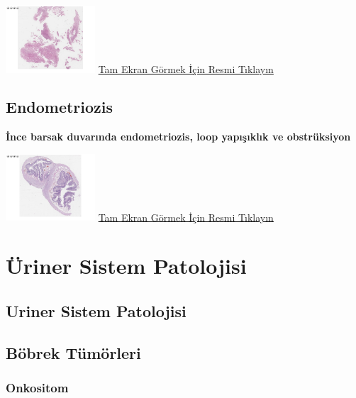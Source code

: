 \documentclass[
  letterpaper,
  DIV=11,
  numbers=noendperiod]{scrreprt}
\begin{document}
\href{https://images.patolojiatlasi.com/endometrial-polyp/HE.html}{\includegraphics[width=0.25\textwidth,height=\textheight]{./screenshots/thumbnail_endometrial-polyp.png}}
\href{https://images.patolojiatlasi.com/endometrial-polyp/HE.html}{Tam
Ekran Görmek İçin Resmi Tıklayın}

\hypertarget{sec-endometriozis}{%
\chapter{Endometriozis}\label{sec-endometriozis}}

\textbf{İnce barsak duvarında endometriozis, loop yapışıklık ve
obstrüksiyon}

\href{https://images.patolojiatlasi.com/endometriosis/HE.html}{\includegraphics[width=0.25\textwidth,height=\textheight]{./screenshots/thumbnail_endometriosis.png}}
\href{https://images.patolojiatlasi.com/endometriosis/HE.html}{Tam Ekran
Görmek İçin Resmi Tıklayın}

\part{Üriner Sistem Patolojisi}

\hypertarget{sec-uriner-sistem-patolojisi}{%
\chapter{Uriner Sistem Patolojisi}\label{sec-uriner-sistem-patolojisi}}

\hypertarget{sec-bobrek-tumorleri}{%
\chapter{Böbrek Tümörleri}\label{sec-bobrek-tumorleri}}

\hypertarget{sec-bobrek-onkositom}{%
\section{Onkositom}\label{sec-bobrek-onkositom}}
\end{document}
